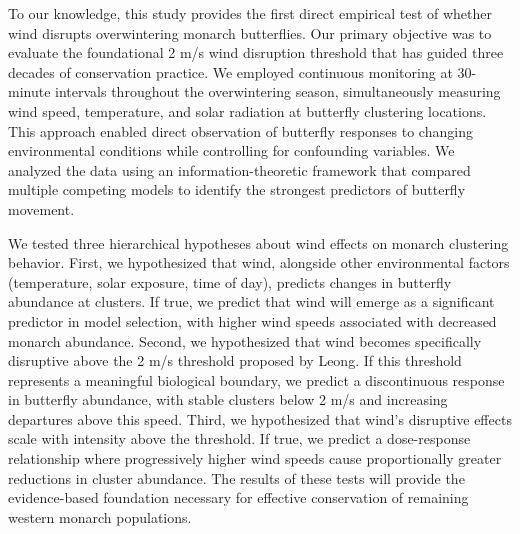 To our knowledge, this study provides the first direct empirical test of whether wind disrupts overwintering monarch butterflies. Our primary objective was to evaluate the foundational 2 m/s wind disruption threshold that has guided three decades of conservation practice. We employed continuous monitoring at 30-minute intervals throughout the overwintering season, simultaneously measuring wind speed, temperature, and solar radiation at butterfly clustering locations. This approach enabled direct observation of butterfly responses to changing environmental conditions while controlling for confounding variables. We analyzed the data using an information-theoretic framework that compared multiple competing models to identify the strongest predictors of butterfly movement.

We tested three hierarchical hypotheses about wind effects on monarch clustering behavior. First, we hypothesized that wind, alongside other environmental factors (temperature, solar exposure, time of day), predicts changes in butterfly abundance at clusters. If true, we predict that wind will emerge as a significant predictor in model selection, with higher wind speeds associated with decreased monarch abundance. Second, we hypothesized that wind becomes specifically disruptive above the 2 m/s threshold proposed by Leong. If this threshold represents a meaningful biological boundary, we predict a discontinuous response in butterfly abundance, with stable clusters below 2 m/s and increasing departures above this speed. Third, we hypothesized that wind's disruptive effects scale with intensity above the threshold. If true, we predict a dose-response relationship where progressively higher wind speeds cause proportionally greater reductions in cluster abundance. The results of these tests will provide the evidence-based foundation necessary for effective conservation of remaining western monarch populations.